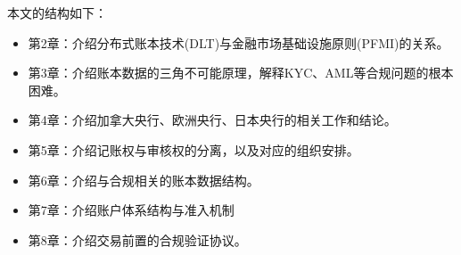 本文的结构如下：
\begin{itemize}
    \item[] 第2章：介绍分布式账本技术(DLT)与金融市场基础设施原则(PFMI)的关系。
    \item[] 第3章：介绍账本数据的三角不可能原理，解释KYC、AML等合规问题的根本困难。
    \item[] 第4章：介绍加拿大央行、欧洲央行、日本央行的相关工作和结论。
    \item[] 第5章：介绍记账权与审核权的分离，以及对应的组织安排。
    \item[] 第6章：介绍与合规相关的账本数据结构。
    \item[] 第7章：介绍账户体系结构与准入机制
    \item[] 第8章：介绍交易前置的合规验证协议。
\end{itemize}



